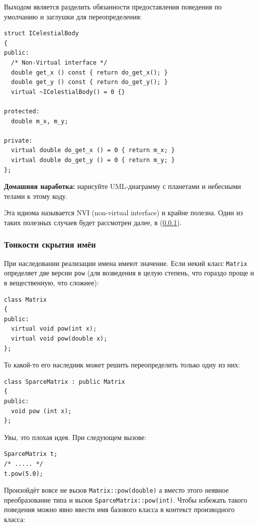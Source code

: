 \documentclass[a4paper,12pt,oneside]{article}
\begin{document}
Выходом является разделить обязанности предоставления поведения по умолчанию и заглушки для переопределения:

\begin{lstlisting}
struct ICelestialBody
{
public:
  /* Non-Virtual interface */
  double get_x () const { return do_get_x(); }
  double get_y () const { return do_get_y(); }
  virtual ~ICelestialBody() = 0 {}

protected:
  double m_x, m_y;

private:
  virtual double do_get_x () = 0 { return m_x; }
  virtual double do_get_y () = 0 { return m_y; }
};
\end{lstlisting}

\textbf{Домашняя наработка:} нарисуйте UML-диаграмму с планетами и небесными телами к этому коду.

Эта идиома называется NVI (non-virtual interface) и крайне полезна. Один из таких полезных случаев будет рассмотрен далее, в (\ref{NameHiding}).

\subsubsection{Тонкости скрытия имён}\label{NameHiding}

При наследовании реализации имена имеют значение. Если некий класс \lstinline!Matrix! определяет две версии \lstinline!pow! (для возведения в целую степень, что гораздо проще и в вещественную, что сложнее):

\begin{lstlisting}
class Matrix
{
public:
  virtual void pow(int x);
  virtual void pow(double x);
};
\end{lstlisting}

То какой-то его наследник может решить переопределить только одну из них:

\begin{lstlisting}
class SparceMatrix : public Matrix
{
public:
  void pow (int x);
};
\end{lstlisting}

Увы, это плохая идея. При следующем вызове:

\begin{lstlisting}
SparceMatrix t;
/* ..... */
t.pow(5.0);
\end{lstlisting}

Произойдёт вовсе не вызов \lstinline!Matrix::pow(double)! а вместо этого неявное преобразование типа и вызов \lstinline!SparceMatrix::pow(int)!. Чтобы избежать такого поведения можно явно ввести имя базового класса в контекст производного класса:
\end{document}
